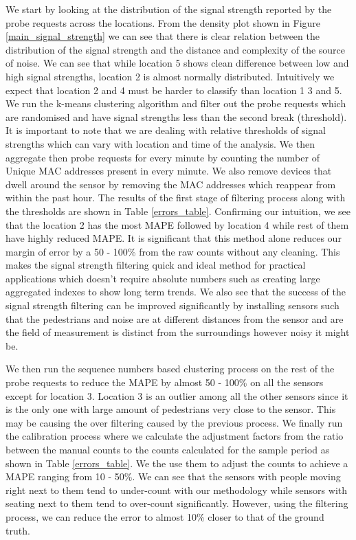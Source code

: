 We start by looking at the distribution of the signal strength reported by the
probe requests across the locations. From the density plot shown in Figure
\ref{main_signal_strength} we can see that there is clear relation between the
distribution of the signal strength and the distance and complexity of the
source of noise. We can see that while location 5 shows clean difference between
low and high signal strengths, location 2 is almost normally distributed.
Intuitively we expect that location 2 and 4 must be harder to classify than
location 1 3 and 5.  We run the k-means clustering algorithm and filter out the
probe requests which are randomised and have signal strengths less than the
second break (threshold).  It is important to note that we are dealing with
relative thresholds of signal strengths which can vary with location and time of
the analysis.  We then aggregate then probe requests for every minute by
counting the number of Unique MAC addresses present in every minute. We also
remove devices that dwell around the sensor by removing the MAC addresses which
reappear from within the past hour.  The results of the first stage of filtering
process along with the thresholds are shown in Table \ref{errors_table}.
Confirming our intuition, we see that the location 2 has the most MAPE followed
by location 4 while rest of them have highly reduced MAPE.  It is significant
that this method alone reduces our margin of error by a 50 - 100\% from the raw
counts without any cleaning.  This makes the signal strength filtering quick and
ideal method for practical applications which doesn't require absolute numbers
such as creating large aggregated indexes to show long term trends.  We also see
that the success of the signal strength filtering can be improved significantly
by installing sensors such that the pedestrians and noise are at different
distances from the sensor and are the field of measurement is distinct from the
surroundings however noisy it might be.

We then run the sequence numbers based clustering process on the rest of the
probe requests to reduce the MAPE by almost 50 - 100\% on all the sensors except
for location 3.  Location 3 is an outlier among all the other sensors since it
is the only one with large amount of pedestrians very close to the sensor.  This
may be causing the over filtering caused by the previous process.  We finally
run the calibration process where we calculate the adjustment factors from the
ratio between the manual counts to the counts calculated for the sample period
as shown in Table \ref{errors_table}.  We the use them to adjust the counts to
achieve a MAPE ranging from 10 - 50\%. We can see that the sensors with people
moving right next to them tend to under-count with our methodology while sensors
with seating next to them tend to over-count significantly. However, using the
filtering process, we can reduce the error to almost 10\% closer to that of the
ground truth.

